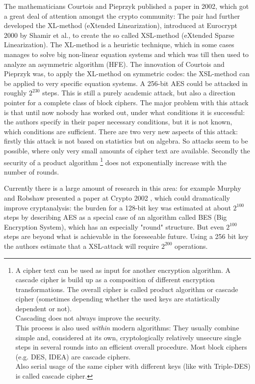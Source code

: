 The mathematicians Courtois and Pieprzyk \cite{Courtois2002} published a paper
in 2002, which got a great deal of attention amongst the crypto community: The
pair had further developed the XL-method (eXtended Linearization), introduced at
Eurocrypt 2000 by Shamir et al., to create the so called XSL-method (eXtended
Sparse Linearization). The XL-method is a heuristic technique, which in some
cases manages to solve big non-linear equation systems and which was till then
used to analyze an asymmetric algorithm (HFE).  The innovation of Courtois and
Pieprzyk was, to apply the XL-method on symmetric codes: the XSL-method can be
applied to very specific equation systems. A 256-bit AES could be attacked in
roughly $2^{230}$ steps. This is still a purely academic attack, but also a
direction pointer for a complete class of block ciphers. The major problem with
this attack is that until now nobody has worked out, under what conditions it is
successful: the authors specify in their paper necessary conditions, but it is
not known, which conditions are sufficient.  There are two very new aspects of
this attack: firstly this attack is not based on statistics but on algebra. So
attacks seem to be possible, where only very small amounts of cipher text are
available. Secondly the security of a product algorithm%
\footnote{%
A cipher text can be used as input for another encryption algorithm. 
A cascade cipher is build up as a composition of different encryption 
transformations. The overall cipher is called product algorithm or cascade cipher (sometimes depending whether the used keys are statistically dependent or not).\\
Cascading does not always improve the security.\\
This process is also used {\em within} modern algorithms:
They usually combine simple and, considered at its own, cryptologically
relatively unsecure single steps in several rounds into an efficient 
overall procedure.  Most block ciphers (e.g. DES, IDEA) are cascade ciphers.\\
Also serial usage of the same cipher with different keys (like with Triple-DES)
is called cascade cipher. 
}
does not exponentially increase with the number of rounds.

Currently there is a large amount of research in this area: for example Murphy and Robshaw presented a paper at Crypto 2002 \cite{Robshaw2002a}, which could dramatically improve cryptanalysis: the burden for a 128-bit key was estimated at about $2^{100}$ steps by describing AES as a special case of an algorithm called BES (Big Encryption System), which has an especially "round" structure. But even $2^{100}$ steps are beyond what is achievable in the foreseeable future. Using a 256 bit key the authors estimate that a XSL-attack will require $2^{200}$ operations.

